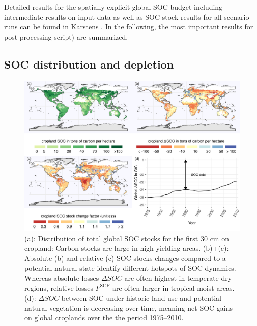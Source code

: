 \documentclass[gc, manuscript]{copernicus}
\begin{document}
Detailed results for the spatially explicit global SOC budget including intermediate results on input data as well as SOC stock results for all scenario runs can be found in Karstens \citeyearpar{karstens_model_2020}. In the following, the most important results \citep[see][]{karstens_result_2020} for post-processing script) are summarized.

\hypertarget{soc-distribution-and-depletion}{%
\subsection{SOC distribution and depletion}\label{soc-distribution-and-depletion}}

\begin{figure}[h]
\includegraphics[width=18cm]{../ResultNotebooks/Output/Images/4panelfigure} \caption{(a): Distribution of total global SOC stocks for the first 30 cm on cropland:  Carbon stocks are large in high yielding areas. (b)+(c): Absolute (b) and relative (c) SOC stocks changes compared to a potential natural state identify different hotspots of SOC dynamics. Whereas absolute losses $\Delta SOC$ are often highest in temperate dry regions, relative losses $F^\mathrm{SCF}$ are often larger in tropical moist areas. (d): $\Delta SOC$ between SOC under historic land use and potential natural vegetation is decreasing over time, meaning net SOC gains on global croplands over the the period 1975--2010. }\label{fig:SOCmaps}
\end{figure}
\end{document}
